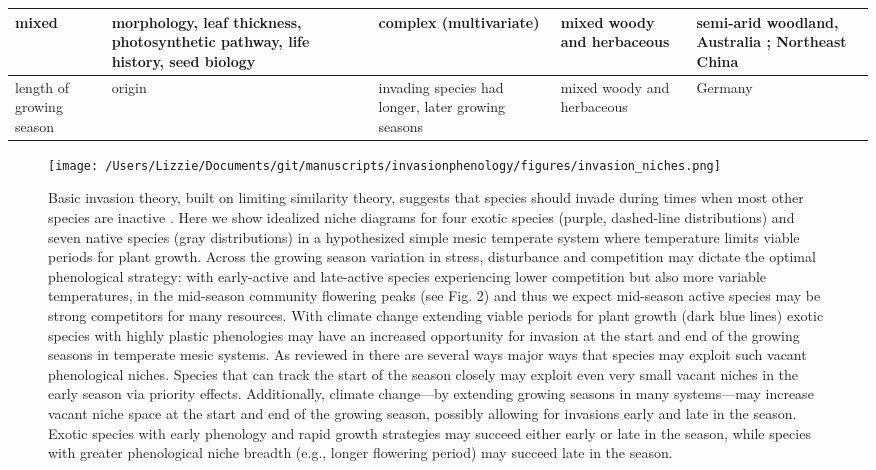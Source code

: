 \documentclass[11pt,a4paper,oneside]{article}
\begin{document}
\begin{center}
\begin{table}
\begin{minipage}{16cm}
\begin{tabular}{ | p{2cm} |  p{2.5 cm} | p{2.5 cm} | p{2.5 cm} | p{5cm} | }
mixed & morphology, leaf thickness, photosynthetic pathway, life history, seed biology & complex (multivariate) & mixed woody and herbaceous & semi-arid woodland, Australia \citep{Leishman1992}; Northeast China \citep{Wang2005} \\ \hline
length of growing season & origin & invading species had longer, later growing seasons & mixed woody and herbaceous & Germany \citep{Kuester2010}\\ \hline \hline
\end{tabular}
\vspace{-0.75\skip\footins}
   \renewcommand{\footnoterule}{}
  \end{minipage}
\end{table}
\end{center}


\newpage
\noindent 
\begin{figure}[h!]
\centering
\noindent \texttt{[image: /Users/Lizzie/Documents/git/manuscripts/invasionphenology/figures/invasion\_niches.png]}
\caption{Basic invasion theory, built on limiting similarity theory, suggests that species should invade during times when most other species are inactive \citep[vacant phenological niche, see][]{wolkovich:2010fee}. Here we show idealized niche diagrams for four exotic species (purple, dashed-line distributions) and seven native species (gray distributions) in a hypothesized simple mesic temperate system where temperature limits viable periods for plant growth. Across the growing season variation in stress, disturbance and competition may dictate the optimal phenological strategy: with early-active and late-active species experiencing lower competition but also more variable temperatures, in the mid-season community flowering peaks (see Fig. 2) and thus we expect mid-season active species may be strong competitors for many resources.  With climate change extending viable periods for plant growth (dark blue lines) exotic species with highly plastic phenologies may have an increased opportunity for invasion at the start and end of the growing seasons in temperate mesic systems. As reviewed in \citet{wolkovich:2010fee} there are several ways major ways that species may exploit such vacant phenological niches. Species that can track the start of the season closely may exploit even very small vacant niches in the early season via priority effects. Additionally, climate change---by extending growing seasons in many systems---may increase vacant niche space at the start and end of the growing season, possibly allowing for invasions early and late in the season. Exotic species with early phenology and rapid growth strategies may succeed either early or late in the season, while species with greater phenological niche breadth (e.g., longer flowering period) may succeed late in the season.}
\end{figure}
\end{document}
